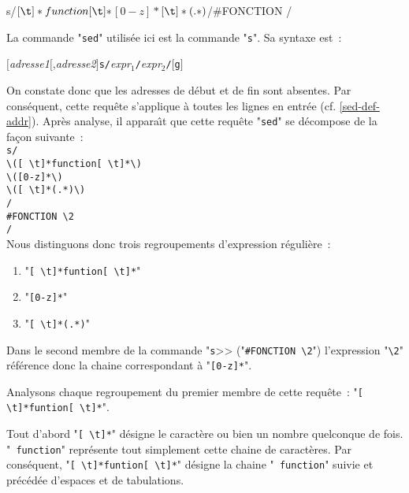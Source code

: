 \begin{example}
\begin{verbatim*}
s/\([ \t]*function[ \t]*\)\([0-z]*\)\([ \t]*(.*)\)/#FONCTION \2/
\end{verbatim*}

La commande "{\tt sed}" utilis{\'e}e ici est la commande "{\tt s}". Sa
syntaxe est~:
\begin{center}
$[${\sl adresse1}$[$,{\sl adresse2}$]${\tt s/}{\it expr$_1$}{\tt /}{\it expr$_2$}{\tt /}$[${\tt g}$]$
\end{center}

On constate donc que les adresses de d{\'e}but et de fin sont absentes. Par
cons{\'e}quent, cette requ{\^e}te s'applique {\`a} toutes les lignes en entr{\'e}e
(cf. \ref{sed-def-addr}). Apr{\`e}s analyse, il appara{\^\i}t que
cette requ{\^e}te "{\tt sed}" se d{\'e}compose de la fa\c{c}on suivante~:\\[1ex]
{\tt s/}\\
\hspace{0.5cm}\verb*=\([ \t]*function[ \t]*\)=\\
\hspace{0.5cm}\verb*=\([0-z]*\)=\\
\hspace{0.5cm}\verb*=\([ \t]*(.*)\)=\\
{\tt /}\\
\hspace{0.5cm}\verb*=#FONCTION \2=\\
{\tt /}\\[1ex]
Nous distinguons donc trois regroupements d'expression r{\'e}guli{\`e}re~:
\begin{enumerate}
	\item	"\verb*=[ \t]*funtion[ \t]*="
	\item	"\verb=[0-z]*="
	\item	"\verb*=[ \t]*(.*)="
\end{enumerate}
Dans le second membre de la commande "{\tt s}>> ("\verb=#FONCTION \2=")
l'expression "\verb=\2=" r{\'e}f{\'e}rence donc la chaine correspondant {\`a}
"\verb=[0-z]*=".

Analysons chaque regroupement du premier membre de cette requ{\^e}te~:
"\verb*=[ \t]*funtion[ \t]*=".

Tout d'abord "\verb*=[ \t]*=" d{\'e}signe le caract{\`e}re
\spacekey ou bien \tabkey un nombre quelconque de fois. "{\tt
function}" repr{\'e}sente tout simplement cette chaine de caract{\`e}res. Par
cons{\'e}quent, "\verb*=[ \t]*funtion[ \t]*=" d{\'e}signe la chaine "{\tt
function}" suivie et pr{\'e}c{\'e}d{\'e}e d'espaces et de tabulations.


\end{example}
